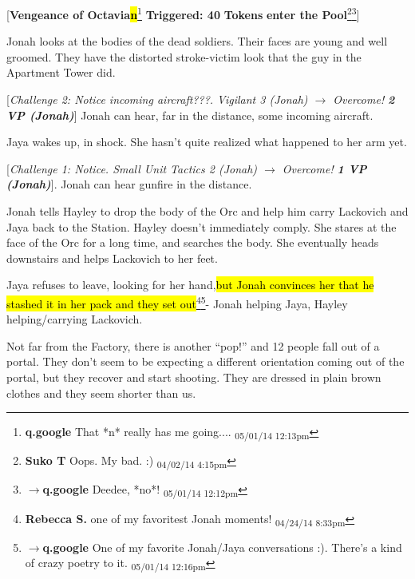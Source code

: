 {[}\textbf{Vengeance of Octavia}\textbf{\hl{n}}\footnote{\textbf{q.google }That *n* really has me going.... \textsubscript{05/01/14 12:13pm}}\textbf{ Triggered: 40}\textbf{ Tokens}\textbf{ enter the Pool}\footnote{\textbf{Suko T }Oops.  My bad.  :) \textsubscript{04/02/14 4:15pm}}\footnote{$\rightarrow$\textbf{q.google }Deedee, *no*! \textsubscript{05/01/14 12:12pm}}{]}



Jonah looks at the bodies of the dead soldiers.  Their faces are young and well groomed. They have the distorted stroke-victim look that the guy in the Apartment Tower did.



{[}\textit{Challenge 2: Notice incoming aircraft}\textit{???}\textit{.  Vigilant 3 (Jonah)  $\rightarrow$ Overcome! }\textit{\textbf{2 VP (Jonah)}}{]}  Jonah can hear, far in the distance, some incoming aircraft.



Jaya wakes up, in shock. She hasn't quite realized what happened to her arm yet.



{[}\textit{Challenge 1: Notice.  Small Unit Tactics 2 (Jonah)  $\rightarrow$ Overcome! }\textit{\textbf{1 VP (Jonah)}}{]}.  Jonah can hear gunfire in the distance.



Jonah tells Hayley to drop the body of the Orc and help him carry Lackovich and Jaya back to the Station.  Hayley doesn't immediately comply.  She stares at the face of the Orc for a long time, and searches the body.  She eventually heads downstairs and helps Lackovich to her feet.



Jaya refuses to leave, looking for her hand,\hl{but Jonah convinces her that he stashed it in her pack and they set out}\footnote{\textbf{Rebecca S. }one of my favoritest Jonah moments! \textsubscript{04/24/14 8:33pm}}\footnote{$\rightarrow$\textbf{q.google }One of my favorite Jonah/Jaya conversations :).  There's a kind of crazy poetry to it. \textsubscript{05/01/14 12:16pm}}- Jonah helping Jaya, Hayley helping/carrying Lackovich.



Not far from the Factory, there is another ``pop!'' and 12 people fall out of a portal.  They don't seem to be expecting a different orientation coming out of the portal, but they recover and start shooting.  They are dressed in plain brown clothes and they seem shorter than us.



